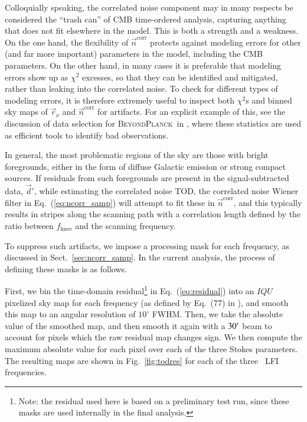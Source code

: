 \documentclass{aa}
\renewcommand{\d}[0]{\vec{d}}
\newcommand{\n}[0]{\vec{n}}
\renewcommand{\r}[0]{\vec{r}}
\newcommand{\BP}{\textsc{BeyondPlanck}}
\begin{document}
Colloquially speaking, the correlated noise component may in many
respects be considered the ``trash can'' of CMB time-ordered analysis,
capturing anything that does not fit elsewhere in the model. This is
both a strength and a weakness. On the one hand, the flexibility of
$\n^{\mathrm{corr}}$ protects against modeling errors for other (and
far more important) parameters in the model, including the CMB
parameters. On the other hand, in many cases it is preferable that
modeling errors show up as $\chi^2$ excesses, so that they can
be identified and mitigated, rather than leaking into the correlated
noise. To check for different types of modeling errors, it is
therefore extremely useful to inspect both $\chi^2$s and binned sky
maps of $\r_\nu$ and $\n^{\mathrm{corr}}$ for artifacts. For an
explicit example of this, see the discussion of data selection for
\BP\ in \citet{bp10}, where these statistics are used as efficient
tools to identify bad observations.

In general, the most problematic regions of the sky are those with
bright foregrounds, either in the form of diffuse Galactic emission or
strong compact sources. If residuals from such foregrounds are present
in the signal-subtracted data, $\d'$, while estimating the correlated
noise TOD, the correlated noise Wiener filter in
Eq.~(\ref{eq:ncorr_samp}) will attempt to fit these in
$\n^{\mathrm{corr}}$, and this typically results in stripes along the
scanning path with a correlation length defined by the ratio between
$f_\mathrm{knee}$ and the scanning frequency.

To suppress such artifacts, we impose a processing mask for each
frequency, as discussed in Sect.~\ref{sec:ncorr_samp}. In the current
analysis, the process of defining these masks is as follows.

First, we bin the time-domain residual\footnote{Note: the residual used here is based on a preliminary test run, since these masks are used internally in the final analysis.} in Eq.~(\ref{eq:residual}) into
  an $IQU$ pixelized sky map for each frequency (as defined by Eq.~(77) in
  \citealp{bp01}), and smooth this map to an angular resolution of
  $10^{\circ}$ FWHM. Then, we take the absolute value of the smoothed map, and then smooth it again with a $30\arcm$ beam to account for pixels which the raw residual map changes sign. We then compute the maximum absolute value for each pixel over each of the three Stokes parameters. The resulting maps are shown in Fig.~\ref{fig:todres} for each of the three \Planck\ LFI frequencies.
\end{document}
